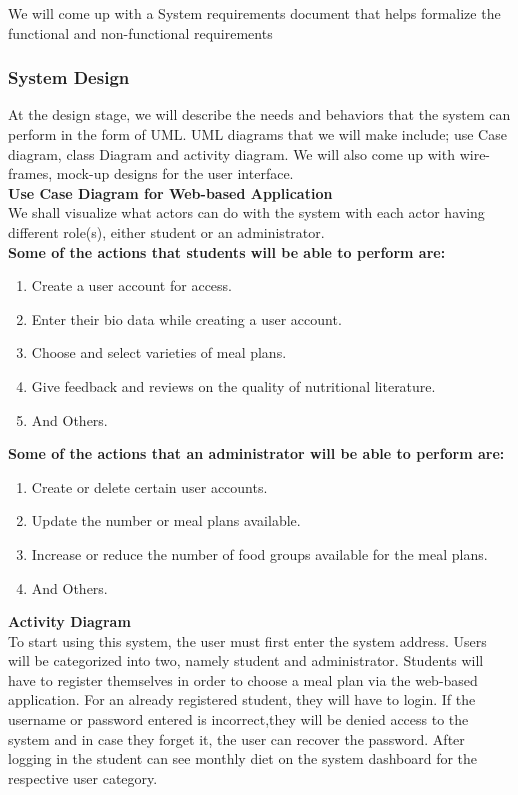 \documentclass {article}
\begin{document}
\noindent We will come up with a System requirements document that helps formalize the functional and non-functional requirements\\

\subsubsection{System Design}
\noindent At the design stage, we will describe the needs and behaviors that the system can perform in the form of UML. UML diagrams that we will make include; use Case diagram, class Diagram and activity diagram. We will also come up with wire-frames, mock-up designs for the user interface.\\

\noindent \textbf{Use Case Diagram for Web-based Application\\}
\noindent We shall visualize what actors can do with the system with each actor having different role(s), either student or an administrator.\\

 \textbf{Some of the actions that students will be able to perform are:}
\begin{enumerate}
\item Create a user account for access.
\item Enter their bio data while creating a user account.
\item Choose and select varieties of meal plans.
\item Give feedback and reviews on the quality of nutritional literature.
\item And Others.
\end{enumerate}

 \textbf{Some of the actions that an administrator will be able to perform are:}
\begin{enumerate}
\item Create or delete certain user accounts.
\item Update the number or meal plans available.
\item Increase or reduce the number of food groups available for the meal plans.
\item And Others.
\end{enumerate}

\noindent \textbf{Activity Diagram \\}
\noindent To start using this system, the user must first enter the system address. Users will be categorized into two, namely student and administrator. Students will have to register themselves in order to choose a meal plan via the web-based application. For an already registered student, they will have to login. If the username or password entered is incorrect,they will be denied access to the system and in case they forget it, the user can recover the password. After logging in the student can see monthly diet on the system dashboard for the respective user category.\\
\end{document}
